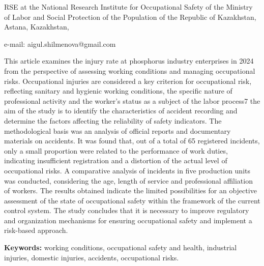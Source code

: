 \begin{affil}
RSE at the National Research Institute for Occupational Safety of the Ministry of Labor and Social Protection of the Population of the Republic of Kazakhstan, Astana, Kazakhstan,

e-mail: aigul.shilmenova@gmail.com
\end{affil}

This article examines the injury rate at phosphorus industry enterprises
in 2024 from the perspective of assessing working conditions and
managing occupational risks. Occupational injuries are considered a key
criterion for occupational risk, reflecting sanitary and hygienic
working conditions, the specific nature of professional activity and the
worker's status as a subject of the labor process7 the aim of the study
is to identify the characteristics of accident recording and determine
the factors affecting the reliability of safety indicators. The
methodological basis was an analysis of official reports and documentary
materials on accidents. It was found that, out of a total of 65
registered incidents, only a small proportion were related to the
performance of work duties, indicating insufficient registration and a
distortion of the actual level of occupational risks. A comparative
analysis of incidents in five production units was conducted,
considering the age, length of service and professional affiliation of
workers. The results obtained indicate the limited possibilities for an
objective assessment of the state of occupational safety within the
framework of the current control system. The study concludes that it is
necessary to improve regulatory and organiza\-tion mechanisms for ensuring
occupational safety and implement a risk-based approach.

{\bfseries Keywords:} working conditions, occupational safety and health,
industrial injuries, domestic injuries, accidents, occupational risks.

